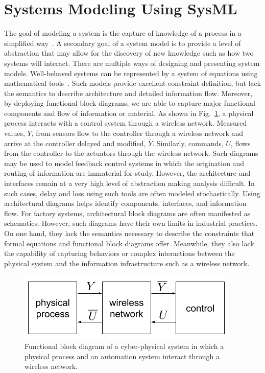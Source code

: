 \section{Systems Modeling Using SysML} \label{sysml:sec:systemsmodeling}

The goal of modeling a system is the capture of knowledge of a process in a simplified way~\cite{SysModel2004}. A secondary goal of a system model is to provide a level of abstraction that may allow for the discovery of new knowledge such as how two systems will interact. There are multiple ways of designing and presenting system models. Well-behaved systems can be represented by a system of equations using mathematical tools~\cite{SimModel1999}. Such models provide excellent constraint definition, but lack the semantics to describe architecture and detailed information flow.
Moreover, by deploying functional block diagrams, we are able to capture major functional components and flow of information or material. As shown in Fig.~\ref{sysml:fig:fbd-system}, a physical process interacts with a control system through a wireless network.  Measured values, $Y$, from sensors flow to the controller through a wireless network and arrive at the controller delayed and modified, $\bar{Y}$. Similarly, commands, $U$, flows from the controller to the actuators through the wireless network. Such diagrams may be used to model feedback control systems in which the origination and routing of information are immaterial for study. However, the architecture and interfaces remain at a very high level of abstraction making analysis difficult. In such cases, delay and loss using such tools are often modeled stochastically. Using architectural diagrams helps identify components, interfaces, and information flow. For factory systems, architectural block diagrams are often manifested as schematics. However, such diagrams have their own limits in industrial practices. On one hand, they lack the semantics necessary to describe the constraints that formal equations and functional block diagrams offer. Meanwhile, they also lack the capability of capturing behaviors or complex interactions between the physical system and the information infrastructure such as a wireless network. 

\begin{figure}
	\centering
	\includegraphics[width=0.65\columnwidth]{./chapter-sysml/diagrams/fbd-system}
	\caption{Functional block diagram of a cyber-physical system in which a physical process and an automation system interact through a wireless network.}
	\label{sysml:fig:fbd-system}
\end{figure}

